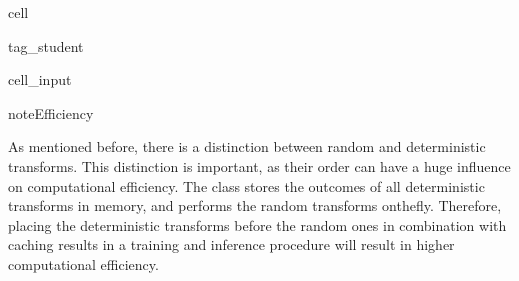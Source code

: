 \documentclass[letterpaper,10pt,english]{jupyterBook}
\begin{document}
\begin{sphinxuseclass}{cell}
\begin{sphinxuseclass}{tag_student}\begin{sphinxVerbatimInput}

\begin{sphinxuseclass}{cell_input}
\begin{sphinxVerbatim}[commandchars=\\\{\}]
  \PYG{p}{[}\PYG{p}{]}


\end{sphinxVerbatim}

\end{sphinxuseclass}\end{sphinxVerbatimInput}

\end{sphinxuseclass}
\end{sphinxuseclass}
\begin{sphinxadmonition}{note}{Efficiency}

\sphinxAtStartPar
As mentioned before, there is a distinction between random and deterministic transforms. This distinction is important, as their order can have a huge influence on computational efficiency. The  class stores the outcomes of all deterministic transforms in memory, and performs the random transforms on\sphinxhyphen{}the\sphinxhyphen{}fly. Therefore, placing the deterministic transforms before the random ones in combination with caching results in a training and inference procedure will result in higher computational efficiency.
\end{sphinxadmonition}
\end{document}
